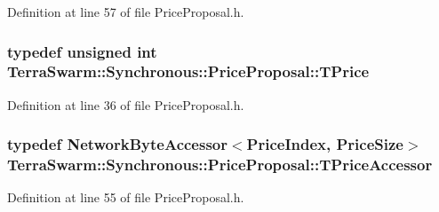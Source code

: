 Definition at line 57 of file Price\-Proposal.\-h.

\hypertarget{class_terra_swarm_1_1_synchronous_1_1_price_proposal_a663093d390a30942a07eee3681ff8fe2}{
\subsubsection[{T\-Price}]{\setlength{\rightskip}{0pt plus 5cm}typedef unsigned int {\bf Terra\-Swarm\-::\-Synchronous\-::\-Price\-Proposal\-::\-T\-Price}}}\label{class_terra_swarm_1_1_synchronous_1_1_price_proposal_a663093d390a30942a07eee3681ff8fe2}


Definition at line 36 of file Price\-Proposal.\-h.

\hypertarget{class_terra_swarm_1_1_synchronous_1_1_price_proposal_a3f7f933da487e691a7d29c0227e1a9c6}{
\subsubsection[{T\-Price\-Accessor}]{\setlength{\rightskip}{0pt plus 5cm}typedef {\bf Network\-Byte\-Accessor}$<${\bf Price\-Index}, {\bf Price\-Size}$>$ {\bf Terra\-Swarm\-::\-Synchronous\-::\-Price\-Proposal\-::\-T\-Price\-Accessor}\hspace{0.3cm}{\ttfamily [private]}}}\label{class_terra_swarm_1_1_synchronous_1_1_price_proposal_a3f7f933da487e691a7d29c0227e1a9c6}


Definition at line 55 of file Price\-Proposal.\-h.



